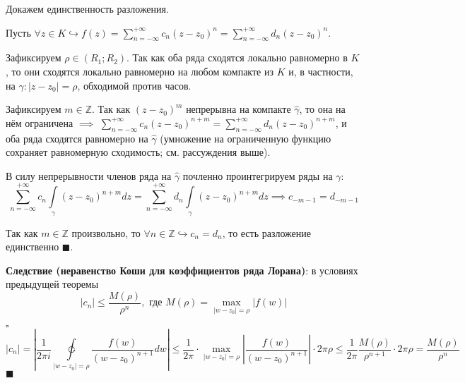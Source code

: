 \documentclass[12pt, a4paper, reqno]{article}
\begin{document}
    Докажем единственность разложения.

    Пусть $\forall z \in K \hookrightarrow f(z) = \sum\limits_{n = -\infty}^{+\infty} c_n (z - z_0)^n =
    \sum\limits_{n = -\infty}^{+\infty} d_n (z - z_0)^n$.

    Зафиксируем $\rho \in (R_1; R_2)$. Так как оба ряда сходятся локально равномерно в $K$, то они
    сходятся локально равномерно на любом компакте из $K$ и, в частности, на
    $\gamma: |z - z_0| = \rho$, обходимой против часов.

    Зафиксируем $m \in \mathbb{Z}$. Так как $(z - z_0)^m$ непрерывна на компакте $\hat{\gamma}$, то
    она на нём ограничена $\implies$ $\sum\limits_{n = -\infty}^{+\infty} c_n (z - z_0)^{n + m} =
    \sum\limits_{n = -\infty}^{+\infty} d_n (z - z_0)^{n + m}$, и оба ряда сходятся равномерно на
    $\hat{\gamma}$ (умножение на ограниченную функцию сохраняет равномерную сходимость;
    см. рассуждения выше).

    В силу непрерывности членов ряда на $\hat{\gamma}$ почленно проинтегрируем ряды на $\gamma$:
    \begin{equation*}
        \sum\limits_{n = -\infty}^{+\infty} c_n \int\limits_{\gamma}(z - z_0)^{n + m}dz =
        \sum\limits_{n = -\infty}^{+\infty} d_n \int\limits_{\gamma}(z - z_0)^{n + m}dz \implies
        c_{-m - 1} = d_{-m - 1}
    \end{equation*}

    Так как $m \in \mathbb{Z}$ произвольно, то $\forall n \in \mathbb{Z} \hookrightarrow c_n = d_n$,
    то есть разложение единственно $\blacksquare$.

    \textbf{Следствие (неравенство Коши для коэффициентов ряда Лорана)}: в условиях предыдущей теоремы
    \begin{equation*}
        |c_n| \leq \frac{M(\rho)}{\rho^n},\text{ где } M(\rho) = \max\limits_{|w - z_0| = \rho} |f(w)|
    \end{equation*}

    $\square$
    \begin{equation*}
        |c_n| = \left|\frac{1}{2\pi i} \ointctrclockwise \limits_{|w - z_0| = \rho}
        \frac{f(w)}{(w - z_0)^{n + 1}}dw\right| \leq
        \frac{1}{2\pi} \cdot \max\limits_{|w - z_0| = \rho}
            \left|\frac{f(w)}{(w - z_0)^{n + 1}}\right| \cdot 2\pi\rho \leq
        \frac{1}{2\pi}\frac{M(\rho)}{\rho^{n + 1}} \cdot 2\pi\rho = \frac{M(\rho)}{\rho^n}
    \end{equation*}
    $\blacksquare$
\end{document}
